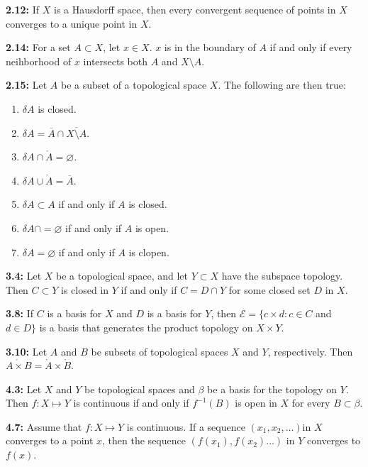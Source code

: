 \documentclass[letterpaper,12pt]{article}
\begin{document}
	\textbf{2.12:}
		If $X$ is a Hausdorff space, then every convergent sequence of points in $X$ converges to a unique point in $X$.
	\newline{}

	\textbf{2.14:}
		For a set $A\subset X$, let $x\in X$. $x$ is in the boundary of $A$ if and only if every neihborhood of $x$ intersects both $A$ and $X\setminus A$.
	\newline{}

	\textbf{2.15:}
		Let $A$ be a subset of a topological space $X$. The following are then true:
	\begin{enumerate}
		\item $\delta A$ is closed.
		\item $\delta A=\overline{A}\cap\overline{X\setminus A}$.
		\item $\delta A\cap\mathring{A}=\varnothing$.
		\item $\delta A\cup\mathring{A}=\overline{A}$.
		\item $\delta A\subset A$ if and only if $A$ is closed.
		\item $\delta A\cap=\varnothing$ if and only if $A$ is open.
		\item $\delta A=\varnothing$ if and only if $A$ is clopen.
	\end{enumerate}

	\textbf{3.4:}
		Let $X$ be a topological space, and let $Y\subset X$ have the subspace topology. Then $C\subset Y$ is closed in $Y$ if and only if $C = D\cap Y$ for some closed set $D$ in $X$.
	\newline{}

	\textbf{3.8:}
		If $C$ is a basis for $X$ and $D$ is a basis for $Y$, then $\mathcal{E}=\{c\times d : c\in C$ and $d\in D\}$ is a basis that generates the product topology on $X\times Y$.
	\newline{}

	\textbf{3.10:}
		Let $A$ and $B$ be subsets of topological spaces $X$ and $Y$, respectively. Then $\mathring{A\times B}=\mathring{A}\times\mathring{B}$.
	\newline{}

	\textbf{4.3:}
		Let $X$ and $Y$ be topological spaces and $\beta$ be a basis for the topology on $Y$. Then $f:X\mapsto Y$ is continuous if and only if $f^{-1}(B)$ is open in $X$ for every $B\subset\beta$.
	\newline{}

	\textbf{4.7:}
		Assume that $f:X\mapsto Y$ is continuous. If a sequence $(x_1, x_2,\ldots)$in $X$ converges to a point $x$, then the sequence $(f(x_1),f(x_2)\ldots)$ in $Y$ converges to $f(x)$.
	\newline{}
\end{document}

